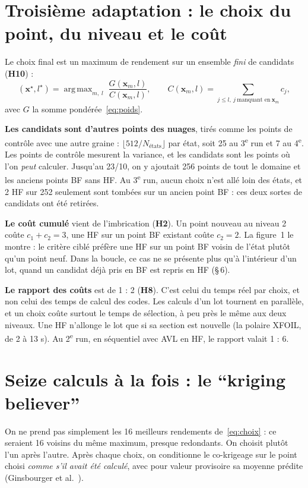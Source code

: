 \documentclass[11pt,a4paper]{article}
\newcommand{\vx}{\bm{x}}
\DeclareMathOperator*{\argmax}{arg\,max}
\begin{document}
\section{Troisième adaptation : le choix du point, du niveau et le coût}
Le choix final est un maximum de rendement sur un ensemble \emph{fini} de candidats (\textbf{H10}) :
\begin{equation}\label{eq:choix}
  (\vx^\star,l^\star)=\argmax_{m,\;l}\;\frac{G(\vx_m,l)}{C(\vx_m,l)},\qquad
  C(\vx_m,l)=\sum_{j\le l,\ j\ \text{manquant en}\ \vx_m} c_j ,
\end{equation}
avec $G$ la somme pondérée~\eqref{eq:poids}.

\textbf{Les candidats sont d'autres points des nuages}, tirés comme les points de contrôle avec une autre
graine : $\lfloor512/N_{\text{états}}\rfloor$ par état, soit 25 au 3\textsuperscript{e} run et 7 au
4\textsuperscript{e}. Les points de contrôle mesurent la variance, et les candidats sont les points où l'on
\emph{peut} calculer. Jusqu'au 23/10, on y ajoutait 256 points de tout le domaine et les anciens points BF
sans HF. Au 3\textsuperscript{e} run, aucun choix n'est allé loin des états, et 2 HF sur 252 seulement sont
tombées sur un ancien point BF : ces deux sortes de candidats ont été retirées.

\textbf{Le coût cumulé} vient de l'imbrication (\textbf{H2}). Un point nouveau au niveau 2 coûte $c_1+c_2=3$,
une HF sur un point BF existant coûte $c_2=2$. La figure~1 le montre : le critère ciblé préfère une HF sur un
point BF voisin de l'état plutôt qu'un point neuf. Dans la boucle, ce cas ne se présente plus qu'à
l'intérieur d'un lot, quand un candidat déjà pris en BF est repris en HF (§\,6).

\textbf{Le rapport des coûts} est de 1 : 2 (\textbf{H8}). C'est celui du temps réel par choix, et non celui
des temps de calcul des codes. Les calculs d'un lot tournent en parallèle, et un choix coûte surtout le
temps de sélection, à peu près le même aux deux niveaux. Une HF n'allonge le lot que si sa section est
nouvelle (la polaire XFOIL, de 2 à 13 s). Au 2\textsuperscript{e} run, en séquentiel avec AVL en HF, le
rapport valait 1 : 6.

\section{Seize calculs à la fois : le \enquote{kriging believer}}
On ne prend pas simplement les 16 meilleurs rendements de~\eqref{eq:choix} : ce seraient 16 voisins du même
maximum, presque redondants. On choisit plutôt l'un après l'autre. Après chaque choix, on conditionne le
co-krigeage sur le point choisi \emph{comme s'il avait été calculé}, avec pour valeur provisoire sa moyenne
prédite (Ginsbourger et al.~\cite{GLC10}).
\end{document}
